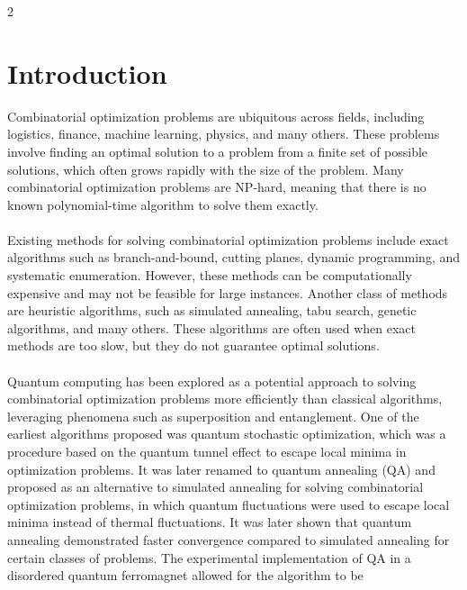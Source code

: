 \documentclass[10pt]{article}
\begin{document}
\begin{multicols*}{2}

\section{Introduction}
Combinatorial optimization problems are ubiquitous across fields, 
including logistics, finance, machine learning, physics, and many others. These problems
involve finding an optimal solution to a problem from a finite set of possible solutions,
which often grows rapidly with the size of the problem. Many combinatorial optimization problems 
are NP-hard, meaning that there is no known polynomial-time algorithm to solve them exactly.\\\\
Existing methods for solving combinatorial optimization problems include exact algorithms such as 
branch-and-bound\cite{AutomaticMethodSolving}, cutting planes\cite{CuttingPlanes1980}, dynamic programming\cite{bellman1957dynamic}, and systematic 
enumeration\cite{balasAdditiveAlgorithmSolving1965}. However, these methods can be computationally expensive and may not be feasible for large instances. 
Another class of methods are heuristic algorithms, such as simulated annealing\cite{kirkpatrickOptimizationSimulatedAnnealing1983}, tabu search\cite{gloverTabuSearch1993}, genetic algorithms\cite{sastryGeneticAlgorithms2005}, and many others. These algorithms are often used when exact methods are too slow, but they do not guarantee optimal solutions. \\\\
Quantum computing has been explored as a potential approach to solving combinatorial optimization problems more efficiently than classical algorithms, leveraging phenomena such as superposition and entanglement. 
One of the earliest algorithms proposed was quantum stochastic optimization, which was a procedure based on the quantum tunnel effect to escape local minima in optimization problems\cite{apolloniQuantumStochasticOptimization1989a}. It was later renamed to quantum annealing (QA) and proposed 
as an alternative to simulated annealing for solving combinatorial optimization problems, in which 
quantum fluctuations were used to escape local minima instead of thermal fluctuations\cite{PDFNumericalImplementation}. It was later shown that quantum annealing demonstrated faster convergence 
compared to simulated annealing for certain classes of problems\cite{kadowakiQuantumAnnealingTransverse1998}.
The experimental implementation of QA in a disordered quantum ferromagnet allowed for the algorithm to be 

\end{multicols*}
\end{document}
